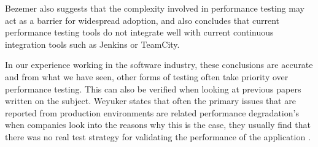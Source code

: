 Bezemer also suggests that the complexity involved in performance testing may act as a barrier for widespread adoption, and also concludes that current performance testing tools do not integrate well with current continuous integration tools such as Jenkins or TeamCity.

In our experience working in the software industry, these conclusions are accurate and from what we have seen, other forms of testing often take priority over performance testing. This can also be verified when looking at previous papers written on the subject. Weyuker states that often the primary issues that are reported from production environments are related performance degradation's when companies look into the reasons why this is the case, they usually find that there was no real test strategy for validating the performance of the application \cite{888628}. 